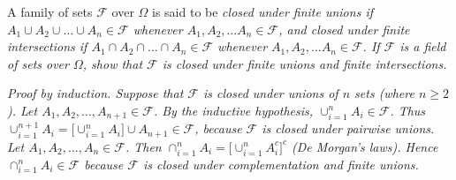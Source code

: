 \begin{homework}
\begin{questions}
\question
A family of sets $\mathcal{F}$ over $\Omega$ is said to be
\bit
\it \emph{closed under finite unions} if $A_1\cup A_2\cup\ldots\cup A_n\in\mathcal{F}$ whenever $A_1,A_2,\ldots A_n\in\mathcal{F}$, and
\it \emph{closed under finite intersections} if $A_1\cap A_2\cap\ldots\cap A_n\in\mathcal{F}$ whenever $A_1,A_2,\ldots A_n\in\mathcal{F}$.
\eit
If $\mathcal{F}$ is a field of sets over $\Omega$, show that $\mathcal{F}$ is closed under finite unions and finite intersections.
\begin{answer}
\bit
\it 
Proof by induction. Suppose that $\mathcal{F}$ is closed under unions of $n$ sets (where $n\geq 2$). Let $A_1,A_2,\ldots,A_{n+1}\in\mathcal{F}$. By the inductive hypothesis, $\cup_{i=1}^nA_i\in\mathcal{F}$. Thus $\cup_{i=1}^{n+1} A_i = \big[\cup_{i=1}^{n} A_i\big] \cup A_{n+1} \in\mathcal{F}$, because $\mathcal{F}$ is closed under pairwise unions.
\it
Let $A_1,A_2,\ldots,A_n\in\mathcal{F}$. Then $\cap_{i=1}^n A_i = \big[\cup_{i=1}^n A_i^c\big]^c$ (De Morgan's laws). Hence $\cap_{i=1}^n A_i\in\mathcal{F}$ because $\mathcal{F}$ is closed under complementation and finite unions.
\eit
\end{answer}
\end{questions}
\end{homework}

\endinput
